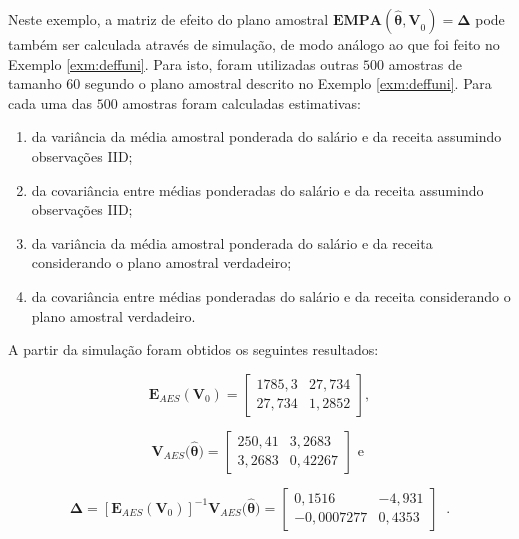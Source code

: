 \documentclass[]{book}
\theoremstyle{definition}
\theoremstyle{definition}
\theoremstyle{definition}
\theoremstyle{remark}
\begin{document}
Neste exemplo, a matriz de efeito do plano amostral
\(\mathbf{EMPA}(\mathbf{\hat{\theta},V}_{0})=\mathbf{\Delta }\) pode
também ser calculada através de simulação, de modo análogo ao que foi
feito no Exemplo \ref{exm:deffuni}. Para isto, foram utilizadas outras
\(500\) amostras de tamanho \(60\) segundo o plano amostral descrito no
Exemplo \ref{exm:deffuni}. Para cada uma das \(500\) amostras foram
calculadas estimativas:

\begin{enumerate}
\def\labelenumi{\arabic{enumi}.}
\item
  da variância da média amostral ponderada do salário e da receita
  assumindo observações IID;
\item
  da covariância entre médias ponderadas do salário e da receita
  assumindo observações IID;
\item
  da variância da média amostral ponderada do salário e da receita
  considerando o plano amostral verdadeiro;
\item
  da covariância entre médias ponderadas do salário e da receita
  considerando o plano amostral verdadeiro.
\end{enumerate}

A partir da simulação foram obtidos os seguintes resultados:

\begin{equation}
\mathbf{E}_{AES}\left( \mathbf{V}_{0}\right) =\left[ 
\begin{array}{rr}
1785,3 & 27,734 \\ 
27,734 & 1,2852
\end{array}
\right],  \label{eq:epa8}
\end{equation}

\begin{equation}
\mathbf{V}_{AES}(\mathbf{\hat{\theta})=}\left[ 
\begin{array}{rr}
250,41 & 3,2683 \\ 
3,2683 & 0,42267
\end{array}
\right] \mbox{ e }  \label{eq:epa9}
\end{equation}

\begin{equation}
\mathbf{\Delta =}\left[ \mathbf{E}_{AES}\left( \mathbf{V}_{0}\right) \right]
^{-1}\mathbf{V}_{AES}(\mathbf{\hat{\theta})=}\left[ 
\begin{array}{rr}
0,1516 & -4,931 \\ 
-0,0007277 & 0,4353
\end{array}
\right] \;\;.  \label{eq:epa10}
\end{equation}
\end{document}

